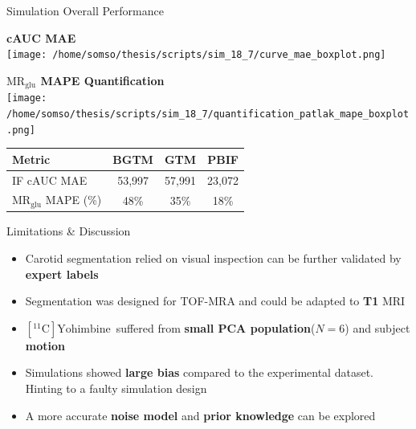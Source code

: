 \documentclass[aspectratio=169]{beamer}
\def\mrglu{\text{MR}_{\text{glu}}}
\newcommand{\yohimbine}{$[^{11}\mathrm{C}]\text{Yohimbine}$}
\begin{document}
\begin{frame}[t]{Simulation Overall Performance}
	\centering
	\begin{center}
		\begin{minipage}{0.35\textwidth}
			\centering
			\textbf{cAUC MAE}\\[0.5ex]
			\texttt{[image: /home/somso/thesis/scripts/sim\_18\_7/curve\_mae\_boxplot.png]}
		\end{minipage}
		\hspace{2em}
		\begin{minipage}{0.35\textwidth}
			\centering
			\textbf{$\mrglu$ MAPE Quantification}\\[0.5ex]
			\texttt{[image: /home/somso/thesis/scripts/sim\_18\_7/quantification\_patlak\_mape\_boxplot.png]}
		\end{minipage}
	\end{center}
	{
	\small
	\begin{tabular}{l|ccc}
		\toprule
		Metric             & BGTM   & GTM    & PBIF   \\
		\midrule
		IF cAUC MAE        & 53,997 & 57,991 & 23,072 \\
		$\mrglu$ MAPE (\%) & 48\%   & 35\%   & 18\%   \\
		\bottomrule
	\end{tabular}

	}
\end{frame}
\begin{frame}{Limitations \& Discussion}
	\begin{itemize}
		\setlength\itemsep{1.8em}
		\item Carotid segmentation relied on visual inspection can be further validated by \textbf{expert labels}
		\item Segmentation was designed for TOF-MRA and could be adapted to \textbf{T1} MRI
		\item \yohimbine\ suffered from \textbf{small PCA population}($N=6$) and subject \textbf{motion}
		\item Simulations showed \textbf{large bias} compared to the experimental dataset. Hinting to a faulty simulation design
		\item A more accurate \textbf{noise model} and \textbf{prior knowledge} can be explored
	\end{itemize}
\end{frame}
\end{document}
